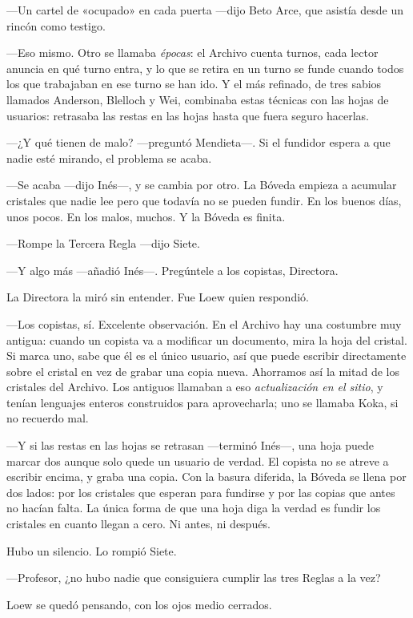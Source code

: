 ---Un cartel de «ocupado» en cada puerta ---dijo Beto Arce, que asistía desde un rincón como testigo.

---Eso mismo. Otro se llamaba \emph{épocas}: el Archivo cuenta turnos, cada lector anuncia en qué turno entra, y lo que se retira en un turno se funde cuando todos los que trabajaban en ese turno se han ido. Y el más refinado, de tres sabios llamados Anderson, Blelloch y Wei, combinaba estas técnicas con las hojas de usuarios: retrasaba las restas en las hojas hasta que fuera seguro hacerlas.

---¿Y qué tienen de malo? ---preguntó Mendieta---\nobreak. Si el fundidor espera a que nadie esté mirando, el problema se acaba.

---Se acaba ---dijo Inés---\nobreak, y se cambia por otro. La Bóveda empieza a acumular cristales que nadie lee pero que todavía no se pueden fundir. En los buenos días, unos pocos. En los malos, muchos. Y la Bóveda es finita.

---Rompe la Tercera Regla ---dijo Siete.

---Y algo más ---añadió Inés---\nobreak. Pregúntele a los copistas, Directora.

La Directora la miró sin entender. Fue Loew quien respondió.

---Los copistas, sí. Excelente observación. En el Archivo hay una costumbre muy antigua: cuando un copista va a modificar un documento, mira la hoja del cristal. Si marca uno, sabe que él es el único usuario, así que puede escribir directamente sobre el cristal en vez de grabar una copia nueva. Ahorramos así la mitad de los cristales del Archivo. Los antiguos llamaban a eso \emph{actualización en el sitio}, y tenían lenguajes enteros construidos para aprovecharla; uno se llamaba Koka, si no recuerdo mal.

---Y si las restas en las hojas se retrasan ---terminó Inés---\nobreak, una hoja puede marcar dos aunque solo quede un usuario de verdad. El copista no se atreve a escribir encima, y graba una copia. Con la basura diferida, la Bóveda se llena por dos lados: por los cristales que esperan para fundirse y por las copias que antes no hacían falta. La única forma de que una hoja diga la verdad es fundir los cristales en cuanto llegan a cero. Ni antes, ni después.

\escena
Hubo un silencio. Lo rompió Siete.

---Profesor, ¿no hubo nadie que consiguiera cumplir las tres Reglas a la vez?

Loew se quedó pensando, con los ojos medio cerrados.

